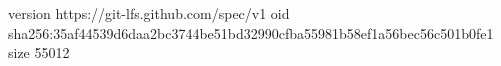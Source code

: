 version https://git-lfs.github.com/spec/v1
oid sha256:35af44539d6daa2bc3744be51bd32990cfba55981b58ef1a56bec56c501b0fe1
size 55012
